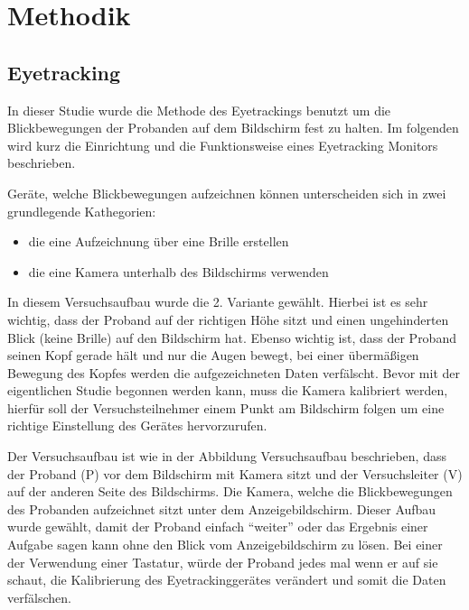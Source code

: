 \chapter{Methodik}

\section{Eyetracking}

In dieser Studie wurde die Methode des Eyetrackings benutzt um die Blickbewegungen der Probanden auf dem Bildschirm fest zu halten. Im folgenden wird kurz die Einrichtung und die Funktionsweise eines Eyetracking Monitors beschrieben. 

Geräte, welche Blickbewegungen aufzeichnen können unterscheiden sich in zwei grundlegende Kathegorien:
    \begin{itemize}
        \item die eine Aufzeichnung über eine Brille erstellen
        \item die eine Kamera unterhalb des Bildschirms verwenden
    \end{itemize}


In diesem Versuchsaufbau wurde die 2. Variante gewählt. Hierbei ist es sehr wichtig, dass der Proband auf der richtigen Höhe sitzt und einen ungehinderten Blick (keine Brille) auf den Bildschirm hat. Ebenso wichtig ist, dass der Proband seinen Kopf gerade hält und nur die Augen bewegt, bei einer übermäßigen Bewegung des Kopfes werden die aufgezeichneten Daten verfälscht. Bevor mit der eigentlichen Studie begonnen werden kann, muss die Kamera kalibriert werden, hierfür soll der Versuchsteilnehmer einem Punkt am Bildschirm folgen um eine richtige Einstellung des Gerätes hervorzurufen. 

Der Versuchsaufbau ist wie in der Abbildung Versuchsaufbau beschrieben, dass der Proband (P) vor dem Bildschirm mit Kamera sitzt und der Versuchsleiter (V) auf der anderen Seite des Bildschirms. Die Kamera, welche die Blickbewegungen des Probanden aufzeichnet sitzt unter dem Anzeigebildschirm. Dieser Aufbau wurde gewählt, damit der Proband einfach ``weiter'' oder das Ergebnis einer Aufgabe sagen kann ohne den Blick vom Anzeigebildschirm zu lösen. Bei einer der Verwendung einer Tastatur, würde der Proband jedes mal wenn er auf sie schaut, die Kalibrierung des Eyetrackinggerätes verändert und somit die Daten verfälschen. 

